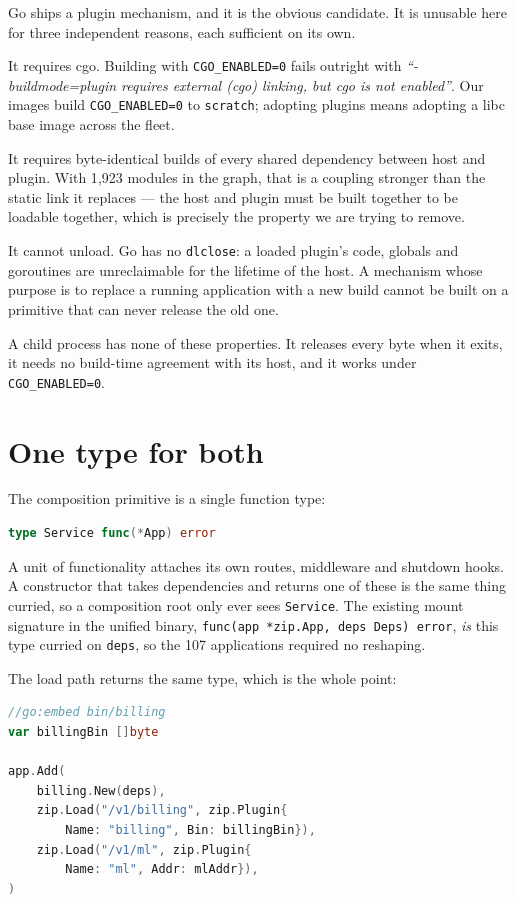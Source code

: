 \documentclass[11pt]{article}
\begin{document}
Go ships a plugin mechanism, and it is the obvious candidate. It is unusable
here for three independent reasons, each sufficient on its own.

It requires cgo. Building with \texttt{CGO\_ENABLED=0} fails outright with
\emph{``-buildmode=plugin requires external (cgo) linking, but cgo is not
enabled''}. Our images build \texttt{CGO\_ENABLED=0} to \texttt{scratch};
adopting plugins means adopting a libc base image across the fleet.

It requires byte-identical builds of every shared dependency between host and
plugin. With 1{,}923 modules in the graph, that is a coupling stronger than the
static link it replaces --- the host and plugin must be built together to be
loadable together, which is precisely the property we are trying to remove.

It cannot unload. Go has no \texttt{dlclose}: a loaded plugin's code, globals
and goroutines are unreclaimable for the lifetime of the host. A mechanism whose
purpose is to replace a running application with a new build cannot be built on
a primitive that can never release the old one.

A child process has none of these properties. It releases every byte when it
exits, it needs no build-time agreement with its host, and it works under
\texttt{CGO\_ENABLED=0}.

\section{One type for both}

The composition primitive is a single function type:

\begin{lstlisting}[language=Go]
type Service func(*App) error
\end{lstlisting}

A unit of functionality attaches its own routes, middleware and shutdown hooks.
A constructor that takes dependencies and returns one of these is the same thing
curried, so a composition root only ever sees \texttt{Service}. The existing
mount signature in the unified binary, \texttt{func(app *zip.App, deps Deps)
error}, \emph{is} this type curried on \texttt{deps}, so the 107 applications
required no reshaping.

The load path returns the same type, which is the whole point:

\begin{lstlisting}[language=Go]
//go:embed bin/billing
var billingBin []byte

app.Add(
    billing.New(deps),
    zip.Load("/v1/billing", zip.Plugin{
        Name: "billing", Bin: billingBin}),
    zip.Load("/v1/ml", zip.Plugin{
        Name: "ml", Addr: mlAddr}),
)
\end{lstlisting}
\end{document}
